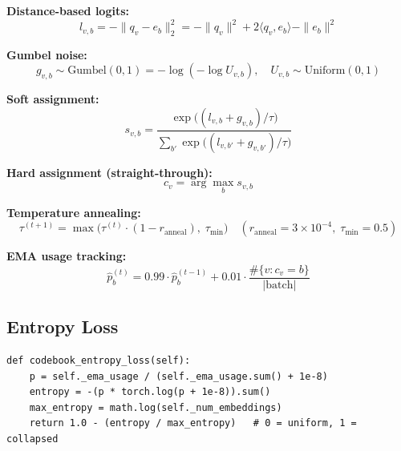 \documentclass[12pt,a4paper]{article}
\begin{document}
\begin{mathbox}[title={Công thức GumbelSoftCodebook đầy đủ}]
\textbf{Distance-based logits:}
\begin{equation}
  l_{v,b} = -\|q_v - e_b\|_2^2
    = -\|q_v\|^2 + 2\langle q_v, e_b\rangle - \|e_b\|^2
  \label{eq:gsb_logit}
\end{equation}

\textbf{Gumbel noise:}
\begin{equation}
  g_{v,b} \sim \text{Gumbel}(0,1) = -\log(-\log U_{v,b}),\quad U_{v,b} \sim \text{Uniform}(0,1)
\end{equation}

\textbf{Soft assignment:}
\begin{equation}
  s_{v,b} = \frac{\exp\bigl((l_{v,b} + g_{v,b})/\tau\bigr)}
    {\sum_{b'}\exp\bigl((l_{v,b'} + g_{v,b'})/\tau\bigr)}
  \label{eq:gsb_soft}
\end{equation}

\textbf{Hard assignment (straight-through):}
\begin{equation}
  c_v = \arg\max_b s_{v,b}
  \label{eq:gsb_hard}
\end{equation}

\textbf{Temperature annealing:}
\begin{equation}
  \tau^{(t+1)} = \max\!\bigl(\tau^{(t)} \cdot (1 - r_\text{anneal}),\; \tau_\text{min}\bigr)
  \quad (r_\text{anneal}=3\times10^{-4},\; \tau_\text{min}=0.5)
  \label{eq:gsb_anneal}
\end{equation}

\textbf{EMA usage tracking:}
\begin{equation}
  \hat{p}_b^{(t)} = 0.99 \cdot \hat{p}_b^{(t-1)} + 0.01 \cdot \frac{\#\{v: c_v=b\}}{|\text{batch}|}
  \label{eq:gsb_ema}
\end{equation}
\end{mathbox}

\subsection{Entropy Loss}

\begin{codebox}[title={codebook.py -- codebook\_entropy\_loss()}]
\begin{lstlisting}
def codebook_entropy_loss(self):
    p = self._ema_usage / (self._ema_usage.sum() + 1e-8)
    entropy = -(p * torch.log(p + 1e-8)).sum()
    max_entropy = math.log(self._num_embeddings)
    return 1.0 - (entropy / max_entropy)   # 0 = uniform, 1 = collapsed
\end{lstlisting}
\end{codebox}
\end{document}
